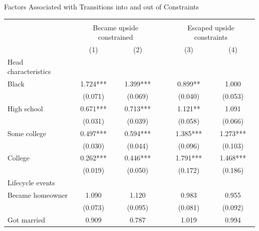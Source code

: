 \begin{center}
\footnotesize
\begin{threeparttable}
\caption{Factors Associated with Transitions into and out of Constraints} \label{TransitionReg}
\begin{tabular}{lccccc}
\hline \hline \\[-1ex]
                          &\multicolumn{2}{c}{Became upside constrained} && \multicolumn{2}{c}{Escaped upside constraints}\\
                          & (1)           & (2)           &&      (3)      & (4)           \\
Head characteristics      &&&&&\\[1ex]
\hspace{.1in}Black                     &       1.724***&       1.399***&&       0.899** &       1.000   \\
                                       &     (0.071)   &     (0.069)   &&     (0.040)   &     (0.053)   \\
\hspace{.1in}High school               &       0.671***&       0.713***&&       1.121** &       1.091   \\
                                       &     (0.031)   &     (0.039)   &&     (0.058)   &     (0.066)   \\
\hspace{.1in}Some college              &       0.497***&       0.594***&&       1.385***&       1.273***\\
                                       &     (0.030)   &     (0.044)   &&     (0.096)   &     (0.103)   \\
\hspace{.1in}College                   &       0.262***&       0.446***&&       1.791***&       1.468***\\
                                       &     (0.019)   &     (0.050)   &&     (0.172)   &     (0.186)   \\
Lifecycle events                       &               &               &&               &               \\[1ex]
\hspace{.1in}Became homeowner          &       1.090   &       1.120   &&       0.983   &       0.955   \\
                                       &     (0.073)   &     (0.095)   &&     (0.081)   &     (0.092)   \\
\hspace{.1in}Got married               &       0.909   &       0.787   &&       1.019   &       0.994   \\

\end{tabular}
\end{threeparttable}
\end{center}
